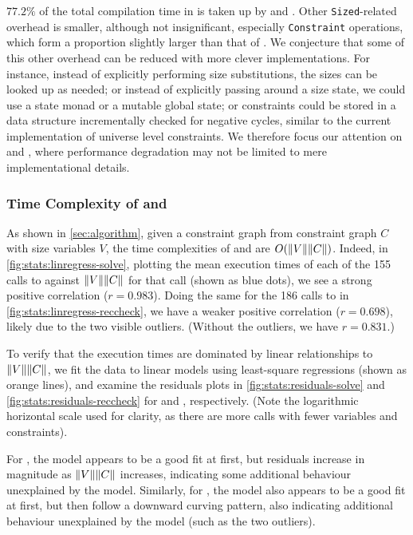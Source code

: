 $77.2\%$ of the total compilation time in \msetlistsized is taken up by \solve and \RecCheck.
Other \texttt{Sized}-related overhead is smaller, although not insignificant,
especially \texttt{Constraint} operations, which form a proportion slightly larger than that of \RecCheck.
We conjecture that some of this other overhead can be reduced with more clever implementations.
For instance, instead of explicitly performing size substitutions, the sizes can be looked up as needed;
or instead of explicitly passing around a size state, we could use a state monad or a mutable global state;
or constraints could be stored in a data structure incrementally checked for negative cycles,
similar to the current implementation of universe level constraints.
We therefore focus our attention on \solve and \RecCheck, where performance degradation may not be limited to mere implementational details.

\subsubsection{Time Complexity of \titlesolve and \titleRecCheck}

As shown in \autoref{sec:algorithm}, given a constraint graph from constraint graph $C$ with size variables $V$,
the time complexities of \solve and \RecCheck are $O(\lVert V\rVert\lVert C\rVert)$.
Indeed, in \autoref{fig:stats:linregress-solve},
plotting the mean execution times of each of the 155 calls to \solve against $\lVert V\rVert\lVert C\rVert$ for that call (shown as blue dots),
we see a strong positive correlation ($r = 0.983$).
Doing the same for the 186 calls to \RecCheck in \autoref{fig:stats:linregress-reccheck},
we have a weaker positive correlation ($r = 0.698$),
likely due to the two visible outliers.
(Without the outliers, we have $r = 0.831$.)

To verify that the execution times are dominated by linear relationships to $\lVert V\rVert\lVert C\rVert$,
we fit the data to linear models using least-square regressions (shown as orange lines),
and examine the residuals plots in \autoref{fig:stats:residuals-solve} and \autoref{fig:stats:residuals-reccheck}
for \solve and \RecCheck, respectively.
(Note the logarithmic horizontal scale used for clarity, as there are more calls with fewer variables and constraints).



For \solve, the model appears to be a good fit at first,
but residuals increase in magnitude as $\lVert V\rVert\lVert C\rVert$ increases,
indicating some additional behaviour unexplained by the model.
Similarly, for \RecCheck, the model also appears to be a good fit at first,
but then follow a downward curving pattern,
also indicating additional behaviour unexplained by the model (such as the two outliers).

